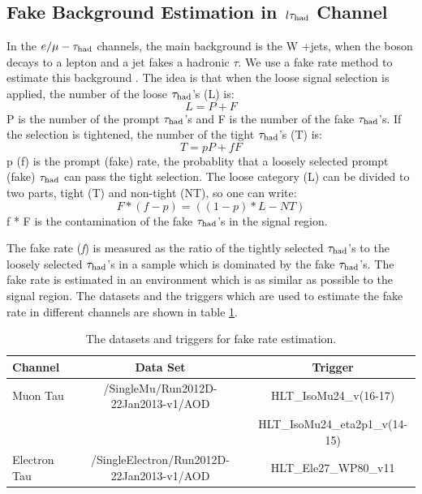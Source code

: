\subsection{\texorpdfstring{Fake Background Estimation in $\,l\tau_{\rm had}$ Channel}{Fake Background Estimation in lepton-tau Channel}}
\label{sect:bkgLeptau}
In the $e/\mu-\tau_{\rm had}$ channels, the main background is the W +jets, when the \Wpm boson decays to a lepton and a jet fakes a hadronic $\tau$.
We use a fake rate method to estimate this background \cite{CMS_AN_2010-261}. 
The idea is that when the loose signal selection is applied, the number of the loose $\tau_{\rm had}$'s (L) is:
\begin{equation}
L = P + F
\end{equation}
P is the number of the  prompt $\tau_{\rm had}$'s and F is the number of the  fake $\tau_{\rm had}$'s. If the selection is tightened, the number of the tight $\tau_{\rm had}$'s (T) is:
\begin{equation}
 T = pP + fF
\end{equation} 
p (f) is the prompt (fake) rate, the probablity that a loosely selected prompt (fake) $\tau_{\rm had}$ can pass the  tight  selection. The loose category (L) can be divided to two parts, 
tight (T) and non-tight (NT), so one can write:
\begin{equation}
   F * (f - p) = ((1 - p) * L - NT)
\end{equation}
f * F is the contamination of the fake $\tau_{\rm had}$'s in the signal region. 

The fake rate ({\it f}) is measured as the ratio of the tightly selected $\tau_{\rm had}$'s to the loosely 
selected $\tau_{\rm had}$'s in a sample which is dominated by the fake $\tau_{\rm had}$'s. The fake rate is estimated in an environment which is as similar as possible to 
the signal region. The datasets and the triggers which are used to estimate the fake rate in different channels are shown in 
table \ref{Tab.DataFR}.
\begin{table}[!htb]
\begin{center}
\caption{The datasets and triggers for fake rate estimation.}
\label{Tab.DataFR}
\begin{tabular}{|l|c|c|}
\hline
Channel      & Data Set                                     & Trigger \\\hline
Muon Tau     & /SingleMu/Run2012D-22Jan2013-v1/AOD          & HLT\_IsoMu24\_v(16-17)\\
             &                                              & HLT\_IsoMu24\_eta2p1\_v(14-15)\\\hline
Electron Tau & /SingleElectron/Run2012D-22Jan2013-v1/AOD    & HLT\_Ele27\_WP80\_v11\\
\hline
\end{tabular}
\end{center}
\end{table}

